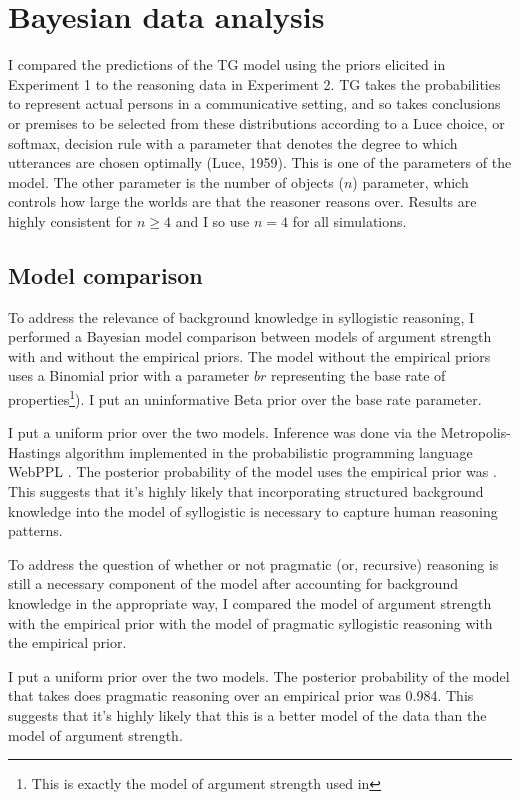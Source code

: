 \documentclass{llncs} %
\begin{document}
\section{Bayesian data analysis}

I compared the predictions of the TG model using the priors elicited in Experiment 1 to the reasoning data in Experiment 2. TG takes the probabilities to represent actual persons in a communicative setting, and so takes conclusions or premises to be selected from these distributions according to a Luce choice, or softmax, decision rule with a parameter that denotes the degree to which utterances are chosen optimally (Luce, 1959). This is one of the parameters of the model. The other parameter is the number of objects ($n$) parameter, which controls how large the worlds are that the reasoner reasons over. Results are highly consistent for $n \geq 4$ and I so use $n =4$ for all simulations.  

\subsection{Model comparison}

To address the relevance of background knowledge in syllogistic reasoning, I performed a Bayesian model comparison between models of argument strength with and without the empirical priors. The model without the empirical priors uses a Binomial prior with a parameter $br$ representing the base rate of properties\footnote{This is exactly the model of argument strength used in }). I put an uninformative Beta prior over the base rate parameter.

I put a uniform prior over the two models. Inference was done via the Metropolis-Hastings algorithm implemented in the probabilistic programming language WebPPL \cite{dippl}. The posterior probability of the model uses the empirical prior was . This suggests that it's highly likely that incorporating structured background knowledge into the model of syllogistic is necessary to capture human reasoning patterns.

To address the question of whether or not pragmatic (or, recursive) reasoning is still a necessary component of the model after accounting for background knowledge in the appropriate way, I compared the model of argument strength with the empirical prior with the model of pragmatic syllogistic reasoning with the empirical prior. 

I put a uniform prior over the two models. The posterior probability of the model that takes does pragmatic reasoning over an empirical prior was 0.984. This suggests that it's highly likely that this is a better model of the data than the model of argument strength. 
\end{document}
